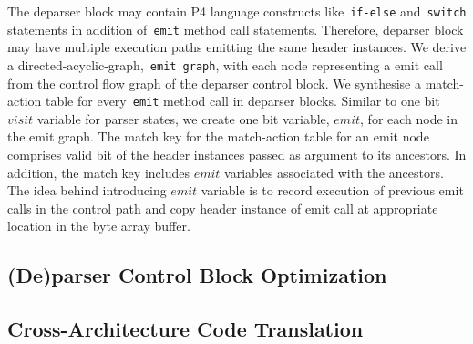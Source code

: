 The deparser block may contain P4 language constructs like~\texttt{if-else} and~\texttt{switch} statements in addition of~\texttt{emit} method call statements.
Therefore, deparser block may have multiple execution paths emitting the same header instances. 
We derive a directed-acyclic-graph,~\texttt{emit graph}, with each node representing a emit call from the control flow graph of the deparser control block.
We synthesise a match-action table for every~\texttt{emit} method call in deparser blocks.
Similar to one bit $visit$ variable for parser states, we create one bit variable, $emit$, for each node in the emit graph.
The match key for the match-action table for an emit node comprises valid bit of the header instances passed as argument to its ancestors.
In addition, the match key includes $emit$ variables associated with the ancestors.
The idea behind introducing $emit$ variable is to record execution of previous emit calls in the control path and copy header instance  of emit call at appropriate location in the byte array buffer.



\subsection{(De)parser Control Block Optimization}


\subsection{Cross-Architecture Code Translation}
